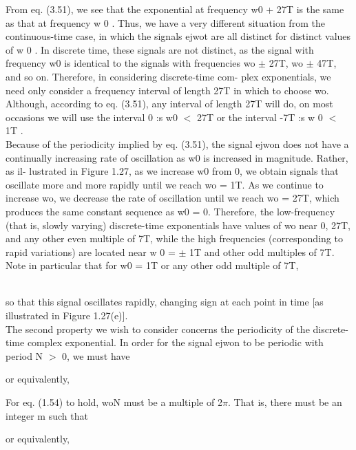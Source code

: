 \documentclass{report}
\begin{document}
From eq. (3.51), we see that the exponential at frequency w0 + 27T is the same as that at frequency w 0 . Thus, we have a very different situation
from the continuous-time case, in which the signals ejwot are all distinct for distinct values of w 0 . In discrete time, these signals are not distinct,
as the signal with frequency w0 is identical to the signals with frequencies wo $\pm $ 27T, wo $\pm $ 47T, and so on. Therefore, in considering discrete-time
com- plex exponentials, we need only consider a frequency interval of length 27T in which to choose wo. Although, according to eq. (3.51), any interval
of length 27T will do, on most occasions we will use the interval 0 :s w0 $<$ 27T or the interval -7T :s w 0 $<$ 1T .\\
Because of the periodicity implied by eq. (3.51), the signal ejwon does not have a continually increasing rate of oscillation as w0 is increased
in magnitude. Rather, as il- lustrated in Figure 1.27, as we increase w0 from 0, we obtain signals that oscillate more and more rapidly until we
reach wo = 1T. As we continue to increase wo, we decrease the rate of oscillation until we reach wo = 27T, which produces the same constant sequence
as w0 = 0. Therefore, the low-frequency (that is, slowly varying) discrete-time exponentials have values of wo near 0, 27T, and any other even multiple
of 7T, while the high frequencies (corresponding to rapid variations) are located near w 0 = $\pm $ 1T and other odd multiples of 7T. Note in particular
that for w0 = 1T or any other odd multiple of 7T,



\\
so that this signal oscillates rapidly, changing sign at each point in time [as illustrated in Figure 1.27(e)].\\
The second property we wish to consider concerns the periodicity of the discrete- time complex exponential. In order for the signal ejwon to be periodic
with period N $>$ 0, we must have



or equivalently,



For eq. (1.54) to hold, woN must be a multiple of 2$\pi $. That is, there must be an integer m such that



or equivalently,
\end{document}
